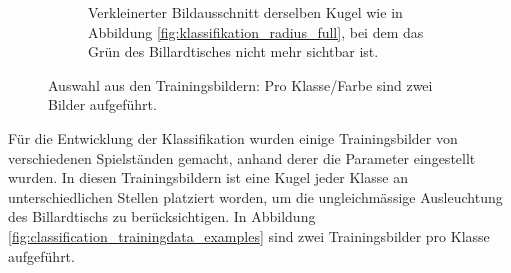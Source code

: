 \begin{figure}[h!]
\begin{subfigure}[t]{0.3\textwidth}
        \caption{
            Verkleinerter Bildausschnitt derselben Kugel wie in Abbildung \ref{fig:klassifikation_radius_full},
            bei dem das Grün des Billardtisches nicht mehr sichtbar ist.
        }
        \label{fig:klassifikation_radius_reduced}
    \end{subfigure}
    \caption{Auswahl aus den Trainingsbildern: Pro Klasse/Farbe sind zwei Bilder aufgeführt.}
    \label{fig:klassifikation_radius}
\end{figure}

Für die Entwicklung der Klassifikation wurden einige Trainingsbilder von verschiedenen Spielständen gemacht,
anhand derer die Parameter eingestellt wurden.
In diesen Trainingsbildern ist eine Kugel jeder Klasse an unterschiedlichen Stellen platziert worden,
um die ungleichmässige Ausleuchtung des Billardtischs zu berücksichtigen.
In Abbildung \ref{fig:classification_trainingdata_examples} sind zwei Trainingsbilder pro Klasse aufgeführt.

